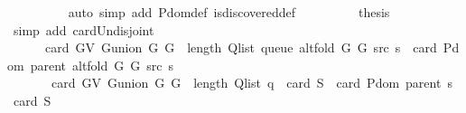 \begin{isabellebody}
\ \ \ \ \ \ \ \ \isamarkupfalse%
\ {\isacharparenleft}{\kern0pt}auto\ simp\ add{\isacharcolon}{\kern0pt}\ P{\isachardot}{\kern0pt}dom{\isacharunderscore}{\kern0pt}def\ is{\isacharunderscore}{\kern0pt}discovered{\isacharunderscore}{\kern0pt}def{\isacharparenright}{\kern0pt}\isanewline
\ \ \ \ \ \ \isamarkupfalse%
\ \isamarkupfalse%
\ {\isacharquery}{\kern0pt}thesis\isanewline
\ \ \ \ \ \ \ \ \isamarkupfalse%
\ {\isacharparenleft}{\kern0pt}simp\ add{\isacharcolon}{\kern0pt}\ card{\isacharunderscore}{\kern0pt}Un{\isacharunderscore}{\kern0pt}disjoint{\isacharparenright}{\kern0pt}\isanewline
\ \ \ \ \isamarkupfalse%
\isanewline
\ \ \ \ \isamarkupfalse%
\ \isamarkupfalse%
\isanewline
\ \ \ \ \ \ {\isachardoublequoteopen}card\ {\isacharparenleft}{\kern0pt}G{\isachardot}{\kern0pt}V\ {\isacharparenleft}{\kern0pt}G{\isachardot}{\kern0pt}union\ G{}\ G{}{\isacharparenright}{\kern0pt}{\isacharparenright}{\kern0pt}\ {\isacharplus}{\kern0pt}\ length\ {\isacharparenleft}{\kern0pt}Q{\isacharunderscore}{\kern0pt}list\ {\isacharparenleft}{\kern0pt}queue\ {\isacharparenleft}{\kern0pt}alt{\isacharunderscore}{\kern0pt}fold\ G{}\ G{}\ src\ s{\isacharparenright}{\kern0pt}{\isacharparenright}{\kern0pt}{\isacharparenright}{\kern0pt}\ {\isacharminus}{\kern0pt}\ card\ {\isacharparenleft}{\kern0pt}P{\isachardot}{\kern0pt}dom\ {\isacharparenleft}{\kern0pt}parent\ {\isacharparenleft}{\kern0pt}alt{\isacharunderscore}{\kern0pt}fold\ G{}\ G{}\ src\ s{\isacharparenright}{\kern0pt}{\isacharparenright}{\kern0pt}{\isacharparenright}{\kern0pt}\ {\isacharequal}{\kern0pt}\isanewline
\ \ \ \ \ \ \ card\ {\isacharparenleft}{\kern0pt}G{\isachardot}{\kern0pt}V\ {\isacharparenleft}{\kern0pt}G{\isachardot}{\kern0pt}union\ G{}\ G{}{\isacharparenright}{\kern0pt}{\isacharparenright}{\kern0pt}\ {\isacharplus}{\kern0pt}\ length\ {\isacharparenleft}{\kern0pt}Q{\isacharunderscore}{\kern0pt}list\ {\isacharquery}{\kern0pt}q{\isacharparenright}{\kern0pt}\ {\isacharplus}{\kern0pt}\ card\ {\isacharquery}{\kern0pt}S\ {\isacharminus}{\kern0pt}\ {\isacharparenleft}{\kern0pt}card\ {\isacharparenleft}{\kern0pt}P{\isachardot}{\kern0pt}dom\ {\isacharparenleft}{\kern0pt}parent\ s{\isacharparenright}{\kern0pt}{\isacharparenright}{\kern0pt}\ {\isacharplus}{\kern0pt}\ card\ {\isacharquery}{\kern0pt}S{\isacharparenright}{\kern0pt}{\isachardoublequoteclose}\isanewline
\ \ \ \ \ \ \isamarkupfalse%

\end{isabellebody}
